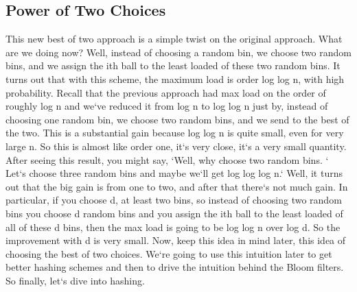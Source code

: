 \subsection{Power of Two Choices}
This new best of two approach is a simple twist on the original approach.
What are we doing now? Well, instead of choosing a random bin, we choose two random bins, and we assign the ith ball to the least loaded of these two random bins.
It turns out that with this scheme, the maximum load is order log log n, with high probability.
Recall that the previous approach had max load on the order of roughly log n and we`ve reduced it from log n to log log n just by, instead of choosing one random bin, we choose two random bins, and we send to the best of the two.
This is a substantial gain because log log n is quite small, even for very large n.
So this is almost like order one, it`s very close, it`s a very small quantity.
After seeing this result, you might say, `Well, why choose two random bins. ` Let`s choose three random bins and maybe we`ll get log log log n.` Well, it turns out that the big gain is from one to two, and after that there`s not much gain.
In particular, if you choose d, at least two bins, so instead of choosing two random bins you choose d random bins and you assign the ith ball to the least loaded of all of these d bins, then the max load is going to be log log n over log d.
So the improvement with d is very small.
Now, keep this idea in mind later, this idea of choosing the best of two choices.
We`re going to use this intuition later to get better hashing schemes and then to drive the intuition behind the Bloom filters.
So finally, let`s dive into hashing.

